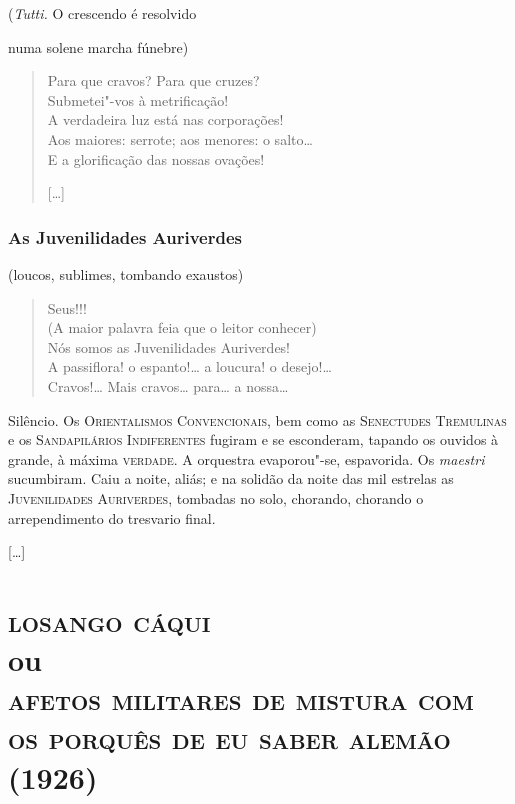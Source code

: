 \hfill{}(\emph{Tutti.} O crescendo é resolvido

\hfill{}numa solene marcha fúnebre)

\begin{verse}
Para que cravos? Para que cruzes?\\
Submetei"-vos à metrificação!\\
A verdadeira luz está nas corporações!\\
Aos maiores: serrote; aos menores: o salto\ldots{}\\
E a glorificação das nossas ovações!

{[}\ldots{}{]}
\end{verse}

\section*{As Juvenilidades Auriverdes}

\hfill{}(loucos, sublimes, tombando exaustos)

\begin{verse}
Seus\dotfill{}!!!\\
(A maior palavra feia que o leitor conhecer)\\
Nós somos as Juvenilidades Auriverdes!\\
A passiflora! o espanto!\ldots{} a loucura! o desejo!\ldots{}\\
Cravos!\ldots{} Mais cravos\ldots{} para\ldots{} a nossa\ldots{}
\end{verse}

Silêncio. Os \textsc{Orientalismos Convencionais}, bem como as
\textsc{Senectudes Tremulinas} e os \textsc{Sandapilários Indiferentes}
fugiram e se esconderam, tapando os ouvidos à grande, à máxima \textsc{verdade}.
A orquestra evaporou"-se, espavorida. Os \emph{maestri} sucumbiram. Caiu
a noite, aliás; e na solidão da noite das mil estrelas as
\textsc{Juvenilidades Auriverdes}, tombadas no solo, chorando, chorando
o arrependimento do tresvario final.

{[}\ldots{}{]}

\part[Losango cáqui]{\textsc{losango cáqui}\\ou\\\textsc{afetos militares de mistura com\\ os porquês de eu saber alemão}\\(1926)}
\removeepigraph


